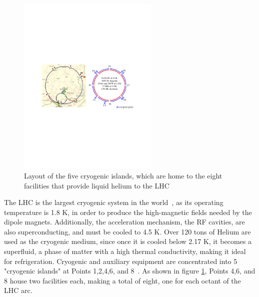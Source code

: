 \begin{figure}[h]
   \centering
  \includegraphics[width=0.6\textwidth]{Figures/LHC_Diagrams/LHC_CoolingPlants.pdf}
  \caption{Layout of the five cryogenic islands, which are home to the
  eight facilities that provide liquid helium to the LHC \cite{LHC:LHC_lhc_cryogen_islands_layout_image}} \label{fig:lhc_cryogenic_islands}
\end{figure}

\par The LHC is the largest cryogenic system in the
world~\cite{LHC:LHC_lhc_cryogen_cernWebsite}, as its operating
temperature is 1.8 K, in order to produce the high-magnetic fields
needed by the dipole magnets.  Additionally, the acceleration
mechanism, the RF cavities, are also superconducting, and must be 
cooled to 4.5 K.  Over 120 tons of Helium are used as the cryogenic
medium, since once it is cooled below 2.17 K, it becomes a superfluid,
a phase of matter with a high thermal conductivity, making it ideal
for refrigeration.  Cryogenic and auxiliary equipment are
concentrated into 5 "cryogenic islands" at Points 1,2,4,6, and
8~\cite{lhc:machine_description}.  As shown in figure
\ref{fig:lhc_cryogenic_islands}, Points 4,6, and 8 house two facilities
each, making a total of eight, one for each octant of the LHC arc. 

